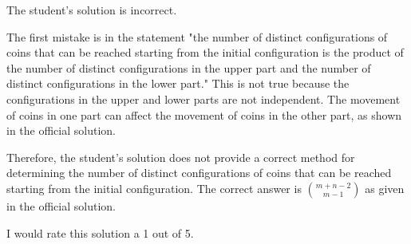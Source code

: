 The student's solution is incorrect.

The first mistake is in the statement "the number of distinct configurations of coins that can be reached starting from the initial configuration is the product of the number of distinct configurations in the upper part and the number of distinct configurations in the lower part." This is not true because the configurations in the upper and lower parts are not independent. The movement of coins in one part can affect the movement of coins in the other part, as shown in the official solution.

Therefore, the student's solution does not provide a correct method for determining the number of distinct configurations of coins that can be reached starting from the initial configuration. The correct answer is $\binom{m+n-2}{m-1}$ as given in the official solution.

I would rate this solution a 1 out of 5.
